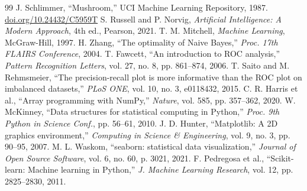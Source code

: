 \documentclass[12pt,a4paper]{article}
\begin{document}
{\footnotesize
\begin{thebibliography}{99}
\setlength{\itemsep}{0pt}
 J. Schlimmer, ``Mushroom,'' UCI Machine Learning Repository, 1987. \url{doi.org/10.24432/C5959T}
 S. Russell and P. Norvig, \emph{Artificial Intelligence: A Modern Approach}, 4th ed., Pearson, 2021.
 T. M. Mitchell, \emph{Machine Learning}, McGraw-Hill, 1997.
 H. Zhang, ``The optimality of Naive Bayes,'' \emph{Proc. 17th FLAIRS Conference}, 2004.
 T. Fawcett, ``An introduction to ROC analysis,'' \emph{Pattern Recognition Letters}, vol. 27, no. 8, pp. 861--874, 2006.
 T. Saito and M. Rehmsmeier, ``The precision-recall plot is more informative than the ROC plot on imbalanced datasets,'' \emph{PLoS ONE}, vol. 10, no. 3, e0118432, 2015.
 C. R. Harris et al., ``Array programming with NumPy,'' \emph{Nature}, vol. 585, pp. 357--362, 2020.
 W. McKinney, ``Data structures for statistical computing in Python,'' \emph{Proc. 9th Python in Science Conf.}, pp. 56--61, 2010.
 J. D. Hunter, ``Matplotlib: A 2D graphics environment,'' \emph{Computing in Science \& Engineering}, vol. 9, no. 3, pp. 90--95, 2007.
 M. L. Waskom, ``seaborn: statistical data visualization,'' \emph{Journal of Open Source Software}, vol. 6, no. 60, p. 3021, 2021.
 F. Pedregosa et al., ``Scikit-learn: Machine learning in Python,'' \emph{J. Machine Learning Research}, vol. 12, pp. 2825--2830, 2011.
\end{thebibliography}}
\end{document}
